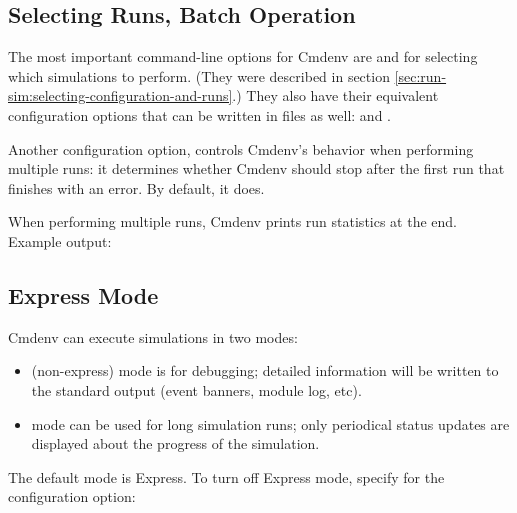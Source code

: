 \subsection{Selecting Runs, Batch Operation}
\label{sec:run-sim:cmdenv-config-options}

The most important command-line options for Cmdenv are  and
 for selecting which simulations to perform. (They were described
in section \ref{sec:run-sim:selecting-configuration-and-runs}.) They also have
their equivalent configuration options that can be written in files as well:
 and .

Another configuration option,  controls
Cmdenv's behavior when performing multiple runs: it determines
whether Cmdenv should stop after the first run that finishes with an
error. By default, it does.

When performing multiple runs, Cmdenv prints run statistics at the end. Example
output:



\subsection{Express Mode}
\label{sec:run-sim:cmdenv:express-mode}

Cmdenv can execute simulations in two modes:

\begin{itemize}
    \item {} (non-express) mode is for debugging; detailed information
        will be written to the standard output (event banners, module log,
        etc).
    \item {} mode can be used for long simulation runs; only
        periodical status updates are displayed about the progress of the
        simulation.
\end{itemize}

The default mode is Express. To turn off Express mode, specify  for
the  configuration option:


